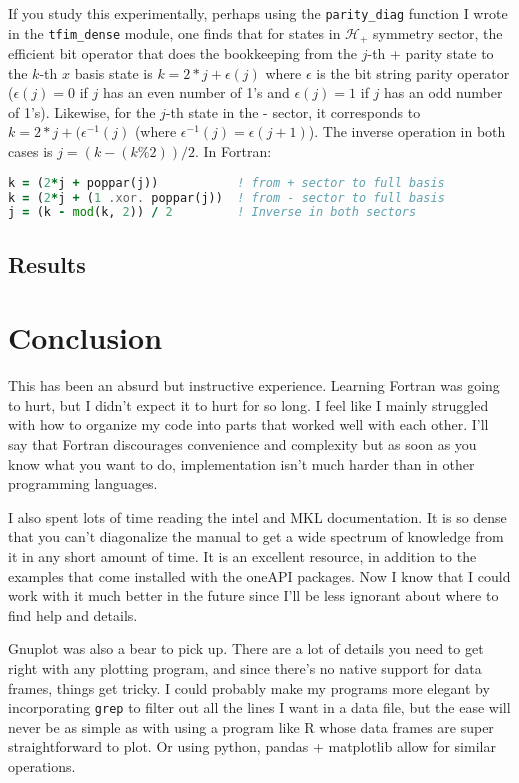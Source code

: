 \documentclass{article}
\begin{document}
If you study this experimentally, perhaps using the {\tt parity\_diag} function
I wrote in the {\tt tfim\_dense} module, one finds that for states in $\mathcal H_+$
symmetry sector, the efficient bit operator that does the bookkeeping from the $j$-th
+ parity state to the $k$-th $x$ basis state is $k = 2*j + \epsilon(j)$ where $\epsilon$
is the bit string parity operator ($\epsilon(j) = 0$ if $j$ has an even number of 1's
and $\epsilon(j) = 1$ if $j$ has an odd number of 1's).
Likewise, for the $j$-th state in the - sector, it corresponds to $k = 2*j + (\epsilon^{-1}(j)$
(where $\epsilon^{-1}(j) = \epsilon(j+1)$).
The inverse operation in both cases is $j = (k - (k \% 2)) / 2$.
In Fortran:
\begin{lstlisting}[language=Fortran]
k = (2*j + poppar(j))           ! from + sector to full basis
k = (2*j + (1 .xor. poppar(j))  ! from - sector to full basis
j = (k - mod(k, 2)) / 2         ! Inverse in both sectors
\end{lstlisting}

\subsection{
Results
}



\newpage

\section{
Conclusion
}

This has been an absurd but instructive experience.
Learning Fortran was going to hurt, but I didn't expect
it to hurt for so long.
I feel like I mainly struggled with how to organize my
code into parts that worked well with each other.
I'll say that Fortran discourages convenience and complexity
but as soon as you know what you want to do, implementation
isn't much harder than in other programming languages.

I also spent lots of time reading the intel and MKL documentation.
It is so dense that you can't diagonalize the manual to get
a wide spectrum of knowledge from it in any short amount of time.
It is an excellent resource, in addition to the examples that come
installed with the oneAPI packages.
Now I know that I could work with it much better in the future
since I'll be less ignorant about where to find help and details.

Gnuplot was also a bear to pick up.
There are a lot of details you need to get right with any plotting program,
and since there's no native support for data frames, things get tricky.
I could probably make my programs more elegant by incorporating {\tt grep}
to filter out all the lines I want in a data file, but the ease will never
be as simple as with using a program like R whose data frames are super
straightforward to plot.
Or using python, pandas + matplotlib allow for similar operations.
\end{document}

